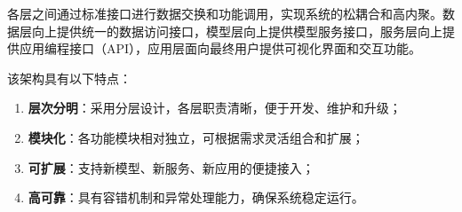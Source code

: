 各层之间通过标准接口进行数据交换和功能调用，实现系统的松耦合和高内聚。数据层向上提供统一的数据访问接口，模型层向上提供模型服务接口，服务层向上提供应用编程接口（API），应用层面向最终用户提供可视化界面和交互功能。

该架构具有以下特点：
\begin{enumerate}
    \item \textbf{层次分明}：采用分层设计，各层职责清晰，便于开发、维护和升级；
    \item \textbf{模块化}：各功能模块相对独立，可根据需求灵活组合和扩展；
    \item \textbf{可扩展}：支持新模型、新服务、新应用的便捷接入；
    \item \textbf{高可靠}：具有容错机制和异常处理能力，确保系统稳定运行。
\end{enumerate}
